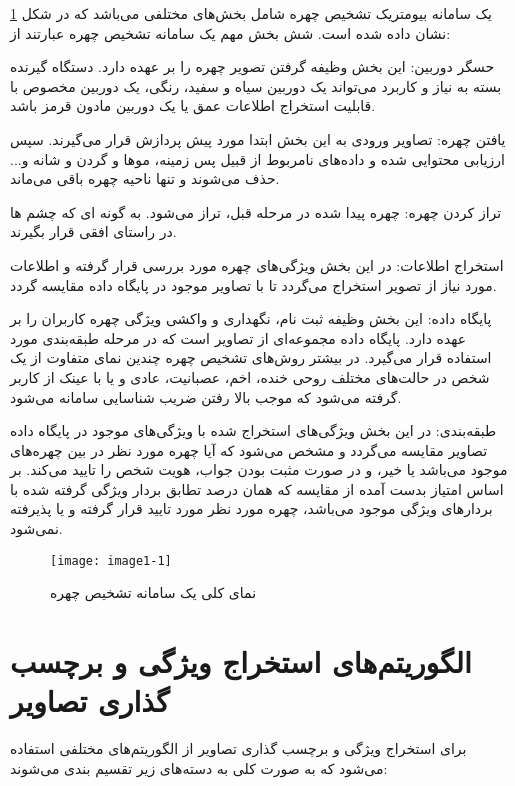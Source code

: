 یک سامانه بیومتریک تشخیص چهره شامل بخش‌های مختلفی می‌باشد که در شکل \ref{image1-1} نشان داده شده است. شش بخش مهم یک سامانه تشخیص چهره عبارتند از:

\noindent
حسگر دوربین: این بخش وظیفه گرفتن تصویر چهره را بر عهده دارد. دستگاه گیرنده بسته به نیاز و کاربرد می‌تواند یک دوربین سیاه و سفید، رنگی، یک دوربین مخصوص با قابلیت استخراج اطلاعات عمق یا یک دوربین مادون قرمز باشد.

\noindent
یافتن چهره: تصاویر ورودی به این بخش ابتدا مورد پیش پردازش قرار می‌گیرند. سپس ارزیابی محتوایی شده و داده‌های نامربوط از قبیل پس زمینه، موها و گردن و شانه و... حذف می‌شوند و تنها ناحیه چهره باقی می‌ماند.

\noindent
تراز کردن چهره: چهره پیدا شده در مرحله قبل، تراز می‌شود. به گونه ای که چشم ها در راستای افقی قرار بگیرند.

\noindent
استخراج اطلاعات: در این بخش ویژگی‌های چهره مورد بررسی قرار گرفته و اطلاعات مورد نیاز از تصویر استخراج می‌گردد تا با تصاویر موجود در پایگاه داده مقایسه گردد.

\noindent
پایگاه داده: این بخش وظیفه ثبت نام، نگهداری و واکشی ویژگی چهره کاربران را بر عهده دارد. پایگاه داده مجموعه‌ای از تصاویر است که در مرحله طبقه‌بندی مورد استفاده قرار می‌گیرد. در بیشتر روش‌های تشخیص چهره چندین نمای متفاوت از یک شخص در حالت‌های مختلف روحی خنده، اخم، عصبانیت، عادی و یا با عینک از کاربر گرفته می‌شود که موجب بالا رفتن ضریب شناسایی سامانه می‌شود.

\noindent
طبقه‌بندی: در این بخش ویژگی‌های استخراج شده با ویژگی‌های موجود در پایگاه داده تصاویر مقایسه می‌گردد و مشخص می‌شود که آیا چهره مورد نظر در بین چهره‌های موجود می‌باشد یا خیر، و در صورت مثبت بودن جواب، هویت شخص را تایید می‌کند. بر اساس امتیاز بدست آمده از مقایسه که همان درصد تطابق بردار ویژگی گرفته شده با بردارهای ویژگی موجود می‌باشد، چهره مورد نظر مورد تایید قرار گرفته و یا پذیرفته نمی‌شود.

\begin{figure}[!h]
\centering
\texttt{[image: image1-1]}
\caption{نمای کلی یک سامانه تشخیص چهره \cite{facial_recognition_block_diagram}}
\label{image1-1}
\end{figure}

\section{ الگوریتم‌های استخراج ویژگی و برچسب گذاری تصاویر }
برای استخراج ویژگی و برچسب گذاری تصاویر از الگوریتم‌های مختلفی استفاده می‌شود که به صورت کلی به دسته‌های زیر تقسیم بندی می‌شوند:

